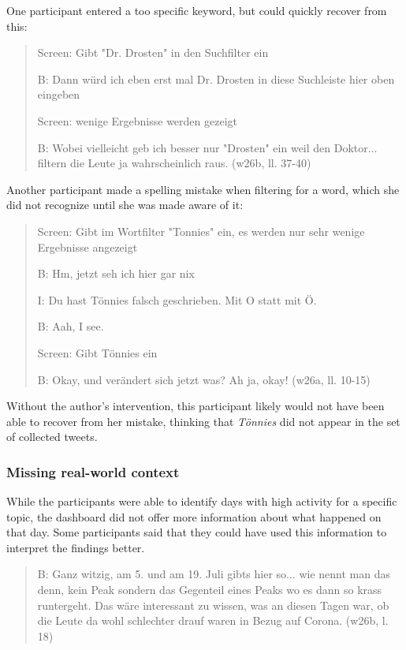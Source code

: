 One participant entered a too specific keyword, but could quickly recover from this:

\begin{quote}
    Screen: Gibt "Dr. Drosten" in den Suchfilter ein

    B: Dann würd ich eben erst mal Dr. Drosten in diese Suchleiste hier oben eingeben

    Screen: wenige Ergebnisse werden gezeigt

    B: Wobei vielleicht geb ich besser nur "Drosten" ein weil den Doktor... filtern die Leute ja wahrscheinlich raus. (w26b, ll. 37-40)
\end{quote}

Another participant made a spelling mistake when filtering for a word, which she did not recognize until she was made aware of it:

\begin{quote}
    Screen: Gibt im Wortfilter "Tonnies" ein, es werden nur sehr wenige Ergebnisse angezeigt

    B: Hm, jetzt seh ich hier gar nix

    I: Du hast Tönnies falsch geschrieben. Mit O statt mit Ö.
    
    B: Aah, I see. 

    Screen: Gibt Tönnies ein

    B: Okay, und verändert sich jetzt was? Ah ja, okay!  (w26a, ll. 10-15)
\end{quote}

Without the author's intervention, this participant likely would not have been able to recover from her mistake, thinking that \emph{Tönnies} did not appear in the set of collected tweets.

\subsubsection*{Missing real-world context}
While the participants were able to identify days with high activity for a specific topic, the dashboard did not offer more information about what happened on that day. Some participants said that they could have used this information to interpret the findings better.

\begin{quote}
    B: Ganz witzig, am 5. und am 19. Juli gibts hier so... wie nennt man das denn, kein Peak sondern das Gegenteil  eines Peaks wo es dann so krass runtergeht. Das wäre interessant zu wissen, was an diesen Tagen war, ob die Leute da wohl schlechter drauf waren in Bezug auf Corona.  (w26b, l. 18)
\end{quote}

